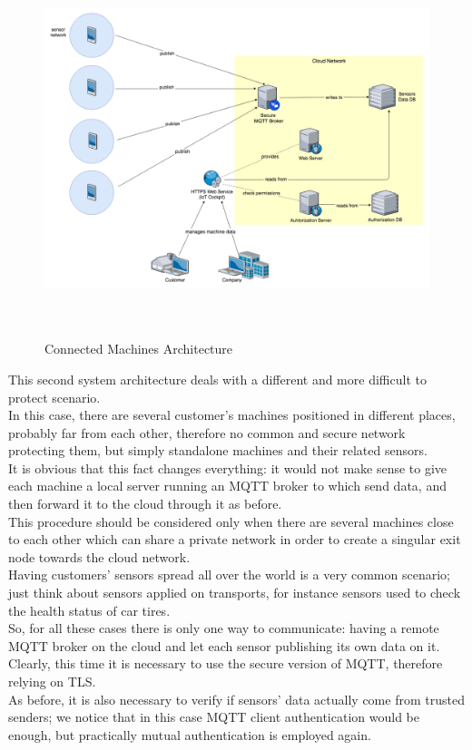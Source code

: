 \documentclass[12pt]{report}
\begin{document}
{{\begin{figure}[H]
\includegraphics[width=14cm,height=11cm,keepaspectratio]{connectedmachines_architecture}
\centering
\caption{Connected Machines Architecture}
\label{ssec:connectedmachines}
\end{figure}

This second system architecture deals with a different and more difficult to protect scenario.\\
In this case, there are several customer's machines positioned in different places, probably far from each other, therefore no common and secure network protecting them, but simply standalone machines and their related sensors.\\
It is obvious that this fact changes everything: it would not make sense to give each machine a local server running an MQTT broker to which send data, and then forward it to the cloud through it as before.\\
This procedure should be considered only when there are several machines close to each other which can share a private network in order to create a singular exit node towards the cloud network.\\

Having customers' sensors spread all over the world is a very common scenario; just think about sensors applied on transports, for instance sensors used to check the health status of car tires.\\

So, for all these cases there is only one way to communicate: having a remote MQTT broker on the cloud and let each sensor publishing its own data on it.\\
Clearly, this time it is necessary to use the secure version of MQTT, therefore relying on TLS.\\
As before, it is also necessary to verify if sensors' data actually come from trusted senders; we notice that in this case MQTT client authentication would be enough, but practically mutual authentication is employed again.\\

}}
\end{document}
